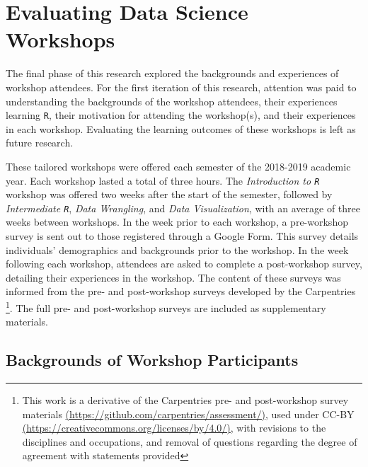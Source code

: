 \documentclass[12pt]{article}
\begin{document}
\section{Evaluating Data Science Workshops}
\label{sec:implement}

\quad The final phase of this research explored the backgrounds and experiences
of workshop attendees. For the first iteration of this research, attention was
paid to understanding the backgrounds of the workshop attendees, their
experiences learning \texttt{R}, their motivation for attending the workshop(s),
and their experiences in each workshop. Evaluating the learning outcomes of
these workshops is left as future research. 

\quad These tailored workshops were offered each semester of the 2018-2019 
academic year. Each workshop lasted a total of three hours. The 
\emph{Introduction to \texttt{R}} workshop was offered two weeks after the start
of the semester, followed by \emph{Intermediate \texttt{R}}, \emph{Data 
Wrangling}, and \emph{Data Visualization}, with an average of three weeks
between workshops. In the week prior to each workshop, a pre-workshop survey is
sent out to those registered through a Google Form. This survey details 
individuals' demographics and backgrounds prior to the workshop. In the week
following each workshop, attendees are asked to complete a post-workshop survey,
detailing their experiences in the workshop. The content of these surveys was
informed from the pre- and post-workshop surveys developed by the Carpentries
\footnote{This work is a derivative of the Carpentries pre- and post-workshop
survey materials \href{https://github.com/carpentries/assessment/}{(https://github.com/carpentries/assessment/)}, used under CC-BY \href{https://creativecommons.org/licenses/by/4.0/}{(https://creativecommons.org/licenses/by/4.0/)}, with revisions to the disciplines and occupations, and removal of questions
regarding the degree of agreement with statements provided}. The full pre- and
post-workshop surveys are included as supplementary materials.

\subsection{Backgrounds of Workshop Participants}
\end{document}
